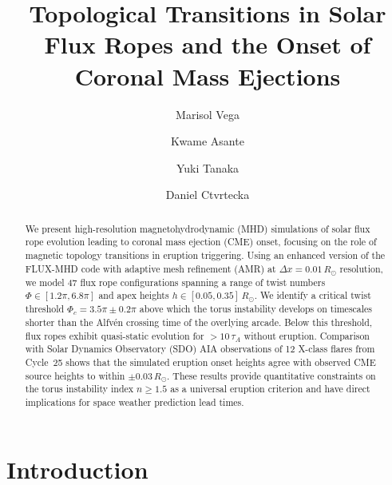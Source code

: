 \documentclass[twocolumn]{aastex631}
\begin{document}
\title{Topological Transitions in Solar Flux Ropes and the Onset of Coronal Mass Ejections}

\author{Marisol Vega}

\author{Kwame Asante}

\author{Yuki Tanaka}

\author{Daniel Ctvrtecka}


\begin{abstract}
We present high-resolution magnetohydrodynamic (MHD) simulations of solar flux rope evolution
leading to coronal mass ejection (CME) onset, focusing on the role of magnetic topology
transitions in eruption triggering. Using an enhanced version of the FLUX-MHD code with
adaptive mesh refinement (AMR) at $\Delta x = 0.01\,R_\odot$ resolution, we model 47 flux rope
configurations spanning a range of twist numbers $\Phi \in [1.2\pi, 6.8\pi]$ and apex heights
$h \in [0.05, 0.35]\,R_\odot$. We identify a critical twist threshold $\Phi_c = 3.5\pi \pm 0.2\pi$
above which the torus instability develops on timescales shorter than the Alfv\'en crossing time
of the overlying arcade. Below this threshold, flux ropes exhibit quasi-static evolution for
$> 10\,\tau_A$ without eruption. Comparison with Solar Dynamics Observatory (SDO) AIA
observations of 12 X-class flares from Cycle~25 shows that the simulated eruption onset heights
agree with observed CME source heights to within $\pm 0.03\,R_\odot$. These results provide
quantitative constraints on the torus instability index $n \geq 1.5$ as a universal eruption
criterion and have direct implications for space weather prediction lead times.
\end{abstract}


\section{Introduction}
\label{sec:intro}
\end{document}
